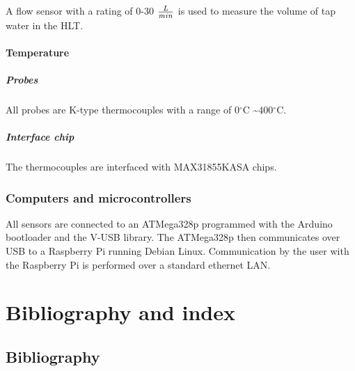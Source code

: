 \documentclass[11pt,fleqn,openany]{book} %
\newcommand{\degree}{\ensuremath{^\circ}}
\begin{document}
A flow sensor with a rating of 0-30 $L \over min$ is used to measure the volume of tap water in the HLT.

\subsection{Temperature}

\subsubsection{Probes}

All probes are K-type thermocouples with a range of $0\degree$C \textasciitilde $400\degree$C.

\subsubsection{Interface chip}

The thermocouples are interfaced with MAX31855KASA chips.

\section{Computers and microcontrollers}

All sensors are connected to an ATMega328p programmed with the Arduino bootloader and the V-USB library. The ATMega328p then communicates over USB to a Raspberry Pi running Debian Linux. Communication by the user with the Raspberry Pi is performed over a standard ethernet LAN.




\part{Bibliography and index}



\chapter*{Bibliography}
\end{document}
